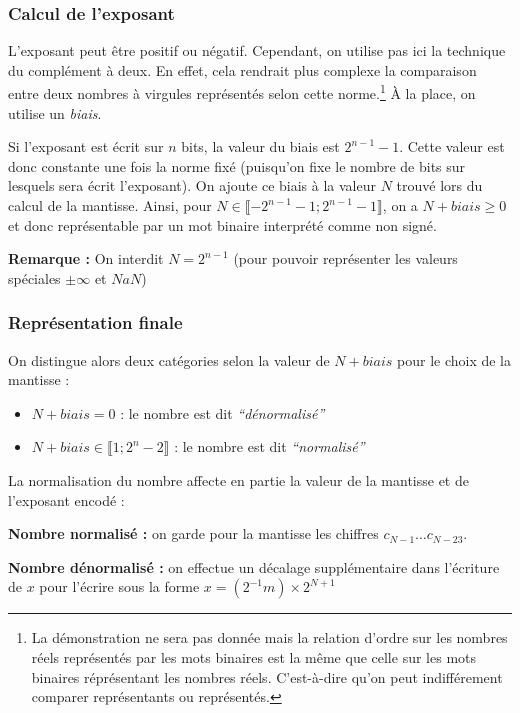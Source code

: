 \documentclass[../../main.tex]{subfiles}
\begin{document}
\subsubsection{Calcul de l'exposant} \label{ssub:calcul_de_l_exposant}
L'exposant peut être positif ou négatif. Cependant, on utilise pas ici la technique du complément à deux. En effet, cela rendrait plus complexe la comparaison entre deux nombres à virgules représentés selon cette norme.\footnote{La démonstration ne sera pas donnée mais la relation d'ordre sur les nombres réels représentés par les mots binaires est la même que celle sur les mots binaires réprésentant les nombres réels. C'est-à-dire qu'on peut indifférement comparer représentants ou représentés.} À la place, on utilise un \textit{biais}.

Si l'exposant est écrit sur $n$ bits, la valeur du biais est $2^{n-1} - 1$. Cette valeur est donc constante une fois la norme fixé (puisqu'on fixe le nombre de bits sur lesquels sera écrit l'exposant). On ajoute ce biais à la valeur $N$ trouvé lors du calcul de la mantisse. Ainsi, pour $N\in{\llbracket -2^{n-1} - 1; 2^{n-1}-1\rrbracket}$, on a $N + biais \geq{0}$ et donc représentable par un mot binaire interprété comme non signé.

\textbf{Remarque :} On interdit $N = 2^{n-1}$ (pour pouvoir représenter les valeurs spéciales $\pm\infty$ et $NaN$)

\subsubsection{Représentation finale} \label{ssub:repr_sentation_finale}
On distingue alors deux catégories selon la valeur de $N + biais$ pour le choix de la mantisse :
\begin{itemize}
     \item $N + biais = 0$ : le nombre est dit \textit{``dénormalisé''}
     \item $N + biais \in{\llbracket{1; 2^{n}-2\rrbracket}}$ : le nombre est dit \textit{``normalisé''}
\end{itemize}
La normalisation du nombre affecte en partie la valeur de la mantisse et de l'exposant encodé :

\textbf{Nombre normalisé :} on garde pour la mantisse les chiffres $c_{N-1}\dots c_{N-23}$.

\textbf{Nombre dénormalisé :} on effectue un décalage supplémentaire dans l'écriture de $x$ pour l'écrire sous la forme $x = (2^{-1}m)\times{2^{N + 1}}$
\end{document}

